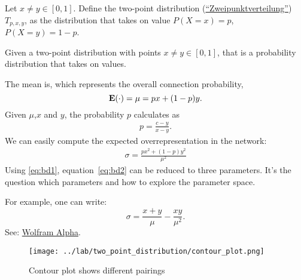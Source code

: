 
Let $x \neq y \in [0,1]$. Define the two-point distribution (\href{https://de.wikipedia.org/wiki/Zweipunktverteilung}{\enquote{Zweipunktverteilung}}) $T_{p,x,y}$, as the distribution that takes on value $P(X=x)=p$, $P(X=y) = 1-p$. 

Given a two-point distribution with points $x \neq y \in [0,1]$, that is a probability distribution that takes on values.

The mean is, which represents the overall connection probability,
\[
\operatorname{\mathbf{E}}(\cdot) = \mu = px + (1-p)y.
\]
Given $\mu$,$x$ and $y$, the probability $p$ calculates as
\begin{align}
  p = \frac{c-y}{x-y}. \label{eq:bd1}
\end{align}
We can easily compute the expected overrepresentation in the network:
\begin{align}
  \sigma = \frac{p x^2 + (1-p) y^2}{\mu^2} \label{eq:bd2}
\end{align}
Using \eqref{eq:bd1}, equation~\eqref{eq:bd2} can be reduced to three parameters. It's the question which parameters and how to explore the parameter space.

For example, one can write:
\[
\sigma = \frac{x+y}{\mu} - \frac{xy}{\mu^2}.
\]
See: \href{https://www.wolframalpha.com/input/?i=Simplify[%28%28%28c-y%29%2F%28x-y%29%29*x^2%2B%281-%28%28c-y%29%2F%28x-y%29%29%29*y^2%29%2Fc^2]}{Wolfram Alpha}.

\begin{figure}[h!]
\centering
\texttt{[image: ../lab/two\_point\_distribution/contour\_plot.png]}
\caption{Contour plot shows different pairings}
\end{figure}



